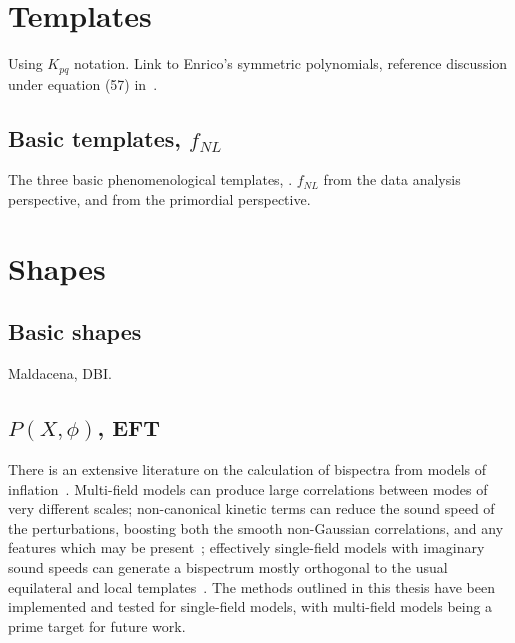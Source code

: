     \section{Templates}
    Using $K_{pq}$ notation.
    Link to Enrico's symmetric polynomials, reference discussion under
    equation (57) in~\cite{Fergusson_2010}.
    \subsection{Basic templates, $f_{NL}$}
    The three basic phenomenological templates, \planck.
    $f_{NL}$ from the data analysis perspective,
    and from the primordial perspective.
    \section{Shapes}
    \subsection{Basic shapes}
    Maldacena, DBI.
    \subsection{$P(X, \phi)$, EFT}
    There is an extensive literature on the calculation
of bispectra from models of inflation~\cite{chen_easther_lim_1,chen_easther_lim_2,chen_ng_0605,seery_ng_0503,px_burrage,adshead,flauger_pajer_resonant,features_bartolo,bdy_passaglia}.
Multi-field models can produce large
correlations between modes of very different scales;
non-canonical kinetic terms can reduce the sound speed of the perturbations,
boosting both the smooth non-Gaussian correlations, and any
features which may be present~\cite{dbi_adshead,dbi_in_the_sky,dbi_miranda,dbi_silverstein,dbi_step_miranda,chen_folded_resonant,osc_avila};
effectively single-field models with imaginary sound speeds can generate a bispectrum
mostly orthogonal to the usual equilateral and local templates~\cite{RP_1}.
The methods outlined in this thesis have been implemented
and tested for single-field models,
with multi-field models being a prime target for future work.


